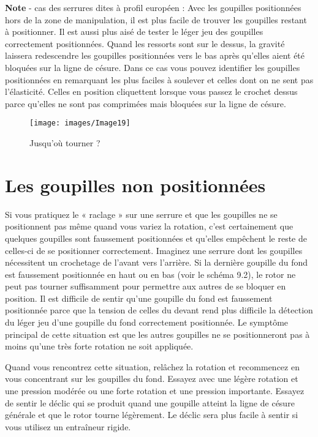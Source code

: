 \documentclass[a4paper,french,11pt,twoside]{report}
\begin{document}
\medskip
\noindent \textbf{Note} - cas des serrures dites à profil européen :
\noindent Avec les goupilles positionnées hors de la zone de manipulation, il est plus facile de trouver les goupilles restant à positionner. Il est aussi plus aisé de tester le léger jeu des goupilles correctement positionnées. Quand les ressorts sont sur le dessus, la gravité laissera redescendre les goupilles positionnées vers le bas après qu'elles aient été bloquées sur la ligne de césure. Dans ce cas vous pouvez identifier les goupilles positionnées en remarquant les plus faciles à soulever et celles dont on ne sent pas l'élasticité. Celles en position cliquettent lorsque vous passez le crochet dessus parce qu'elles ne sont pas comprimées mais bloquées sur la ligne de césure.

\begin{figure}[ht] \begin{center}
        \texttt{[image: images/Image19]}
        \caption{Jusqu'où tourner ?}
\end{center} \end{figure}


\section{Les goupilles non positionnées}

Si vous pratiquez le « raclage » sur une serrure et que les goupilles ne se positionnent pas même quand vous variez la rotation, c'est certainement que quelques goupilles sont faussement positionnées et qu'elles empêchent le reste de celles-ci de se positionner correctement. Imaginez une serrure dont les goupilles nécessitent un crochetage de l'avant vers l'arrière. Si la dernière goupille du fond est faussement positionnée en haut ou en bas (voir le schéma 9.2), le rotor ne peut pas tourner suffisamment pour permettre aux autres de se bloquer en position. Il est difficile de sentir qu'une goupille du fond est faussement positionnée parce que la tension de celles du devant rend plus difficile la détection du léger jeu d'une goupille du fond correctement positionnée. Le symptôme principal de cette situation est que les autres goupilles ne se positionneront pas à moins qu'une très forte rotation ne soit appliquée.

Quand vous rencontrez cette situation, relâchez la rotation et recommencez en vous concentrant sur les goupilles du fond. Essayez avec une légère rotation et une pression modérée ou une forte rotation et une pression importante. Essayez de sentir le déclic qui se produit quand une goupille atteint la ligne de césure générale et que le rotor tourne légèrement. Le déclic sera plus facile à sentir si vous utilisez un entraîneur rigide.
\end{document}
